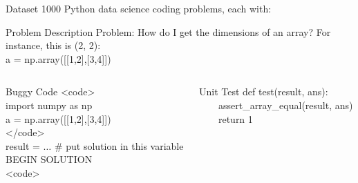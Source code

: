 \begin{frame}{Dataset}
    1000 Python data science coding problems, each with:
    \begin{block}{Problem Description}
        \small
        Problem:
        How do I get the dimensions of an array? For instance, this is (2, 2):\\
        a = np.array([[1,2],[3,4]])
    \end{block}

    \begin{columns}[T]
        \begin{column}{0.50\textwidth}
            \begin{block}{Buggy Code}
                \small
                <code>\\
                import numpy as np\\
                a = np.array([[1,2],[3,4]])\\
                </code>\\
                result = $\ldots$ \# put solution in this variable\\
                BEGIN SOLUTION\\
                <code>
            \end{block}
        \end{column}
        \begin{column}{0.45\textwidth}
            \begin{block}{Unit Test}
                \small
                def test(result, ans):\\
                \ \ \ \ assert\_array\_equal(result, ans)\\
                \ \ \ \ return 1
            \end{block}
        \end{column}
    \end{columns}
\end{frame}
